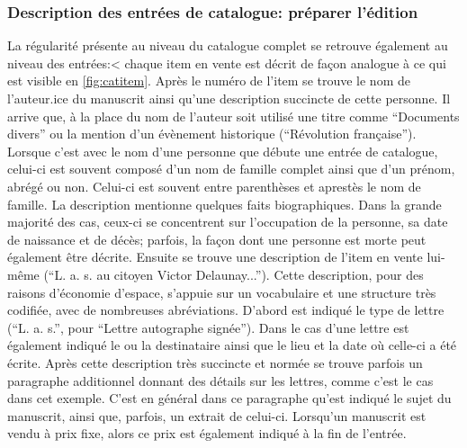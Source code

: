 \subsubsection{Description des entrées de catalogue: préparer l'édition \tei{}}

La régularité présente au niveau du catalogue complet se retrouve également au niveau des entrées:< chaque item en vente est décrit de façon analogue à ce qui est visible en \ref{fig:catitem}. Après le numéro de l'item se trouve le nom de l'auteur.ice du manuscrit ainsi qu'une description succincte de cette personne. Il arrive que, à la place du nom de l'auteur soit utilisé une titre comme \enquote{Documents divers} ou la mention d'un évènement historique (\enquote{Révolution française}). Lorsque c'est avec le nom d'une personne que débute une entrée de catalogue, celui-ci est souvent composé d'un nom de famille complet ainsi que d'un prénom, abrégé ou non. Celui-ci est souvent entre parenthèses et aprestès le nom de famille. La description mentionne quelques faits biographiques. Dans la grande majorité des cas, ceux-ci se concentrent sur l'occupation de la personne, sa date de naissance et de décès; parfois, la façon dont une personne est morte peut également être décrite. Ensuite se trouve une description de l'item en vente lui-même (\enquote{L. a. s. au citoyen Victor Delaunay...}). Cette description, pour des raisons d'économie d'espace, s'appuie sur un vocabulaire et une structure très codifiée, avec de nombreuses abréviations. D'abord est indiqué le type de lettre (\enquote{L. a. s.}, pour \enquote{Lettre autographe signée}). Dans le cas d'une lettre est également indiqué le ou la destinataire ainsi que le lieu et la date où celle-ci a été écrite. Après cette description très succincte et normée se trouve parfois un paragraphe additionnel donnant des détails sur les lettres, comme c'est le cas dans cet exemple. C'est en général dans ce paragraphe qu'est indiqué le sujet du manuscrit, ainsi que, parfois, un extrait de celui-ci. Lorsqu'un manuscrit est vendu à prix fixe, alors ce prix est également indiqué à la fin de l'entrée.

